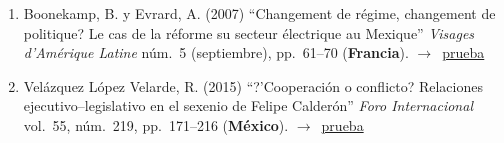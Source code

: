 \documentclass[12 pt, letter]{article}
\newenvironment{CitasMiTrabajo}{
    \begin{footnotesize}
    \begin{enumerate}[label={\footnotesize\emph{cita~\arabic*}},ref=\arabic*] %
        \setlength{\itemsep}{.1\itemsep}
        \setlength{\parskip}{.1\parskip}
    }{\end{enumerate}\end{footnotesize}}
\begin{document}
        \begin{CitasMiTrabajo}

        \item Boonekamp, B. y Evrard, A. (2007)
        ``Changement de r\'egime, changement de politique? Le cas de la r\'eforme su secteur \'electrique au Mexique'' \emph{Visages d'Am\'erique Latine} n\'um.~5 (septiembre), pp.~61--70 (\textbf{Francia}). $\rightarrow$~\href{https://github.com/emagar/cv/blob/master/citasMiTrab/magarRomeroFAE/beatrix.pdf}{prueba}

        \item Vel\'azquez L\'opez Velarde, R. (2015)
        ``?'Cooperaci\'on o conflicto? Relaciones ejecutivo--legislativo en el sexenio de Felipe Calder\'on'' \emph{Foro Internacional} vol.~55, n\'um.~219, pp.~171--216 (\textbf{M\'exico}). $\rightarrow$~\href{https://github.com/emagar/cv/blob/master/citasMiTrab/magarRomeroFAE/vellovel2015.pdf}{prueba}



        \label{ncites:magar.romero.fae.2007} %

        \end{CitasMiTrabajo}




\end{document}
